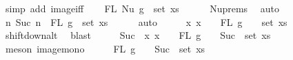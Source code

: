 \begin{isabellebody}
\ {\isacharparenleft}{\kern0pt}simp\ add{\isacharcolon}{\kern0pt}\ image{\isacharunderscore}{\kern0pt}iff{\isacharparenright}{\kern0pt}\isanewline
\isanewline
\ \ \isamarkupfalse%
\ {\isachardoublequoteopen}FL\ {\isacharparenleft}{\kern0pt}Nu\ g{\isacharparenright}{\kern0pt}\ {\isasymsubseteq}\ set\ xs{\isachardoublequoteclose}\isanewline
\ \ \ \ \isamarkupfalse%
\ Nu{\isachardot}{\kern0pt}prems{\isacharparenleft}{\kern0pt}{}{\isacharparenright}{\kern0pt}\ \isamarkupfalse%
\ auto\isanewline
\ \ \isamarkupfalse%
\ \isamarkupfalse%
\ {\isachardoublequoteopen}{\isacharbraceleft}{\kern0pt}n{\isachardot}{\kern0pt}\ Suc\ n\ {\isasymin}\ FL\ g{\isacharbraceright}{\kern0pt}\ {\isasymsubseteq}\ set\ xs{\isachardoublequoteclose}\isanewline
\ \ \ \ \isamarkupfalse%
\ auto\isanewline
\ \ \isamarkupfalse%
\ \isamarkupfalse%
\ {\isachardoublequoteopen}{\isacharparenleft}{\kern0pt}{\isasymlambda}x{\isachardot}{\kern0pt}\ x\ {\isacharminus}{\kern0pt}\ {}{\isacharparenright}{\kern0pt}\ {\isacharbackquote}{\kern0pt}\ {\isacharparenleft}{\kern0pt}FL\ g\ {\isacharminus}{\kern0pt}\ {\isacharbraceleft}{\kern0pt}{}{\isacharbraceright}{\kern0pt}{\isacharparenright}{\kern0pt}\ {\isasymsubseteq}\ set\ xs{\isachardoublequoteclose}\isanewline
\ \ \ \ \isamarkupfalse%
\ shift{\isacharunderscore}{\kern0pt}down{\isacharunderscore}{\kern0pt}alt\ \isamarkupfalse%
\ blast\isanewline
\ \ \isamarkupfalse%
\ \isamarkupfalse%
\ {\isachardoublequoteopen}Suc\ {\isacharbackquote}{\kern0pt}\ {\isacharparenleft}{\kern0pt}{\isasymlambda}x{\isachardot}{\kern0pt}\ x\ {\isacharminus}{\kern0pt}\ {}{\isacharparenright}{\kern0pt}\ {\isacharbackquote}{\kern0pt}\ {\isacharparenleft}{\kern0pt}FL\ g\ {\isacharminus}{\kern0pt}\ {\isacharbraceleft}{\kern0pt}{}{\isacharbraceright}{\kern0pt}{\isacharparenright}{\kern0pt}\ {\isasymsubseteq}\ Suc\ {\isacharbackquote}{\kern0pt}\ set\ xs{\isachardoublequoteclose}\isanewline
\ \ \ \ \isamarkupfalse%
\ {\isacharparenleft}{\kern0pt}meson\ image{\isacharunderscore}{\kern0pt}mono{\isacharparenright}{\kern0pt}\isanewline
\ \ \isamarkupfalse%
\ \isamarkupfalse%
\ {\isachardoublequoteopen}{\isacharparenleft}{\kern0pt}FL\ g\ {\isacharminus}{\kern0pt}\ {\isacharbraceleft}{\kern0pt}{}{\isacharbraceright}{\kern0pt}{\isacharparenright}{\kern0pt}\ {\isasymsubseteq}\ Suc\ {\isacharbackquote}{\kern0pt}\ set\ xs{\isachardoublequoteclose}\isanewline

\end{isabellebody}

